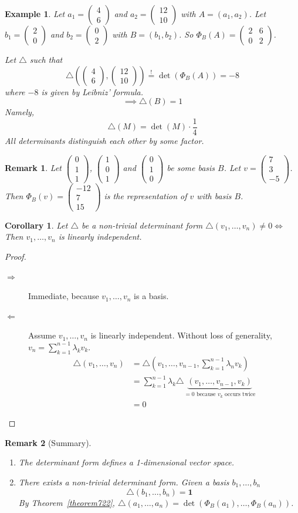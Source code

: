 \documentclass{article}
\newtheorem{example}{Example}  \numberwithin{example}{section}
\newtheorem{remark}{Remark}  \numberwithin{remark}{section}
\newtheorem{corollary}{Corollary}  \numberwithin{corollary}{section}
\newcommand{\vectwo}[2]{\begin{pmatrix} #1 \\ #2 \end{pmatrix}}
\newcommand{\vecthree}[3]{\begin{pmatrix} #1 \\ #2 \\ #3 \end{pmatrix}}
\begin{document}
\begin{example}
  Let $a_1 = \vectwo46$ and $a_2 = \vectwo{12}{10}$ with $A = (a_1, a_2)$.
  Let $b_1 = \vectwo20$ and $b_2 = \vectwo02$ with $B = (b_1, b_2)$.
  So $\Phi_B(A) = \begin{pmatrix} 2 & 6 \\ 0 & 2 \end{pmatrix}$.

  Let $\triangle$ such that
  \[ \triangle(\vectwo46, \vectwo{12}{10}) \overset!= \det(\Phi_B(A)) = -8 \]
  where $-8$ is given by Leibniz' formula.
  \[ \implies \triangle(B) = 1 \]
  Namely,
  \[ \triangle(M) = \det(M) \cdot \frac14 \]
  All determinants distinguish each other by some factor.
\end{example}

\begin{remark}
  Let $\vecthree011$, $\vecthree101$ and $\vecthree010$ be some basis $B$.
  Let $v = \vecthree{7}{3}{-5}$. Then $\Phi_B(v) = \vecthree{-12}{7}{15}$ is the representation of $v$ with basis $B$.
\end{remark}

\begin{corollary} %
  \label{folgerung723}
  Let $\triangle$ be a non-trivial determinant form $\triangle(v_1, \dots, v_n) \neq 0 \iff$
  Then $v_1, \dots, v_n$ is linearly independent.
\end{corollary}
\begin{proof}
  \begin{description}
    \item[$\Rightarrow$] Immediate, because $v_1, \dots, v_n$ is a basis.
    \item[$\Leftarrow$]
      Assume $v_1, \dots, v_n$ is linearly independent.
      Without loss of generality, $v_n = \sum_{k=1}^{n-1} \lambda_k v_k$.
      \begin{align*}
        \triangle(v_1, \dots, v_n)
          &= \triangle(v_1, \dots, v_{n-1}, \sum_{k=1}^{n-1} \lambda_n v_k) \\
          &= \sum_{k=1}^{n-1} \lambda_k \triangle \underbrace{(v_1, \dots, v_{n-1}, v_k)}_{=0 \text{ because $v_k$ occurs twice}} \\
          &= 0
      \end{align*}
  \end{description}
\end{proof}

\begin{remark}[Summary]
  \begin{enumerate}
    \item The determinant form defines a 1-dimensional vector space.
    \item There exists a non-trivial determinant form. Given a basis $b_1, \dots, b_n$
      \[ \triangle(b_1, \dots, b_n) = \mathbf 1 \]
      By Theorem~\ref{theorem722}, $\triangle(a_1, \dots, a_n) = \det(\Phi_B(a_1), \dots, \Phi_B(a_n))$.
  \end{enumerate}
\end{remark}
\end{document}
